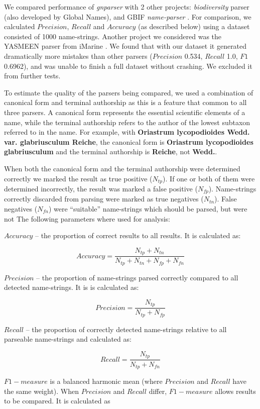 \documentclass{bmcart}
\begin{document}
We compared performance of \textit{gnparser} with 2 other projects:
\textit{biodiversity} parser \cite{Boyle2013, biodiversity} (also developed by
Global Names), and GBIF \textit{name-parser} \cite{gbifNameParser}. For
comparison, we calculated $Precision$, $Recall$ and $Accuracy$ (as described
below) using a dataset consisted of 1000 name-strings. Another project we
considered was the YASMEEN parser from iMarine  \cite{VandenBerghe2015}. We found that with our dataset it generated dramatically more mistakes
than other parsers ($Precision$ 0.534, $Recall$ 1.0, $F1$ 0.6962), and was
unable to finish a full dataset without crashing. We excluded it from further tests.

To estimate the quality of the parsers being compared, we used a
combination of canonical form and terminal authorship as this is a feature that  common to all three parsers.  A canonical form
represents the essential scientific elements of a name, while the terminal authorship
refers to the author of the lowest subtaxon referred to in the name. For
example, with \textbf{Oriastrum lycopodioides Wedd.  var.  glabriusculum Reiche}, the
canonical form is \textbf{Oriastrum lycopodioides glabriusculum} and the terminal
authorship is \textbf{Reiche}, not \textbf{Wedd.}.

 When both the canonical form and the terminal authorship were determined
correctly we marked the result as true positive ($N_{tp}$).  If one or both
of them were determined incorrectly, the result was marked a false positive
($N_{fp}$). Name-strings correctly discarded from parsing were marked as
true negatives ($N_{tn}$). False negatives ($N_{fn}$) were ``suitable''
name-strings which should be parsed, but were not The
following parameters where used for analysis:

$Accuracy$ -- the proportion of correct results to all results.  It is calculated
as:

\[Accuracy = \dfrac{N_{tp} + N_{tn}}{N_{tp} + N_{tn} + N_{fp} + N_{fn}}\]

$Precision$ -- the proportion of name-strings parsed correctly compared to all detected
name-strings. It is is calculated as:

\[Precision = \dfrac{N_{tp}}{N_{tp} + N_{fp}}\]

$Recall$ -- the proportion of correctly detected name-strings relative to all parseable
name-strings and calculated as:

\[Recall = \dfrac{N_{tp}}{N_{tp} + N_{fn}}\]

$F1-measure$ is a balanced harmonic mean (where $Precision$ and $Recall$ have
the same weight). When $Precision$ and $Recall$ differ, $F1-measure$ allows
results to be compared. It is calculated as
\end{document}
